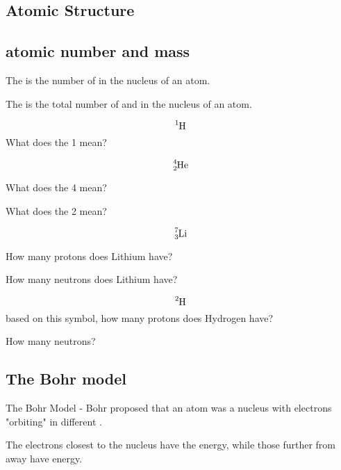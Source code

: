 \documentclass[12pt]{exam}
\begin{document}
\twocolumn
    
\begin{questions}
        
\section{Atomic Structure}

\subsection{atomic number and mass}

\question The  is the number of \fillin[protons][3cm] in the nucleus of an atom.

\question The  is the total number of \fillin[protons][2cm] and \fillin[neutrons][2cm]in the nucleus of an atom.



\question $$\ce{^{1}_{}H}$$
What does the 1 mean?

\fillwithlines{2cm}


\question $$\ce{^{4}_{2}He}$$

\question What does the 4 mean? 

\fillwithlines{1cm}

\question What does the 2 mean?
\fillwithlines{1cm}

\question $$\ce{^{7}_{3}Li}$$

How many protons does Lithium have? \fillin[3][2cm]

How many neutrons does Lithium have? \fillin[4][2cm]

\question $$\ce{^{2}_{}H}$$ based on this symbol, how many protons does Hydrogen have? \fillin[1][1cm]

How many neutrons? \fillin[1][1cm]

\vspace{3cm}

\subsection{The Bohr model}

\question   The Bohr Model - Bohr proposed that an atom was a nucleus with electrons "orbiting" in different .

\question The electrons closest to the nucleus have the \fillin[lowest] energy, while those further from away have \fillin[higher] energy.

\end{questions}
\end{document}
